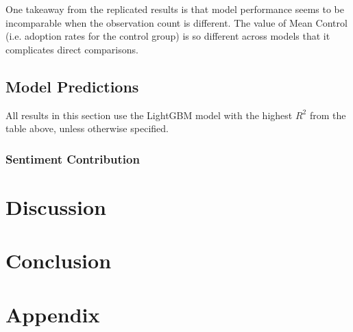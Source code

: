 \documentclass[12pt]{article}
\begin{document}
One takeaway from the replicated results is that model performance seems to be incomparable when the observation count is different. The value of Mean Control (i.e. adoption rates for the control group) is so different across models that it complicates direct comparisons.

\subsection{Model Predictions}
All results in this section use the LightGBM model with the highest $R^2$ from the table above, unless otherwise specified.


\subsubsection{Sentiment Contribution}
\section{Discussion}
\label{section:discussion}

\section{Conclusion}
\label{section:conclusion}

\newpage
\printbibliography
\newpage

\section{Appendix}
\end{document}
